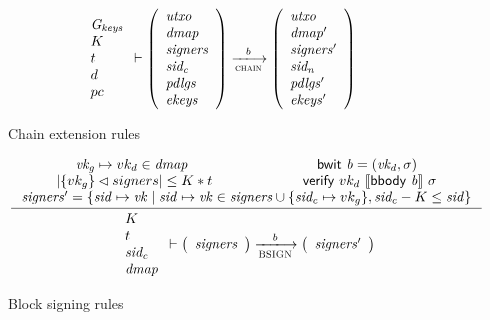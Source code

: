 \begin{figure}
\begin{equation}
{{\begin{array}{l}
         \Gkeys\\
         K\\
         t\\
         d\\
         pc
      \end{array}}
      \vdash
      {
        \left(
          \begin{array}{l}
            \var{utxo}\\
            \var{dmap}\\
            \var{signers}\\
            \var{sid_c}\\
            \var{pdlgs}\\
            \var{ekeys}
          \end{array}
        \right)
      }
      \trans{chain}{b}
      {
        \left(
          \begin{array}{l}
            \var{utxo}\\
            \var{dmap'}\\
            \var{signers'}\\
            \var{sid_n}\\
            \var{pdlgs'}\\
            \var{ekeys'}
          \end{array}
        \right)
      }
    }
  \end{equation}
  \caption{Chain extension rules}
  \label{fig:rules:chain-extension}
\end{figure}


\begin{figure}
  \begin{equation}
    \label{eq:rule:block-signing}
    \inference
    {\var{vk_g} \mapsto vk_d \in \var{dmap} & \bwit{b} = (\var{vk_d}, \sigma)\\
      \size{\{vk_g\} \restrictdom signers} \leq K * t &
      \verify{vk_d}{\serialised{\bbody{b}}}{\sigma} \\
      \var{signers'} =
         \{ \var{sid} \mapsto \var{vk}
          \mid  \var{sid} \mapsto \var{vk} \in \var{signers} \cup \{\var{sid_c} \mapsto vk_g\}
          , \var{sid_c} - K \leq \var{sid} \}
    }
    {
      {\begin{array}{l}
         K\\
         t\\
         \var{sid_c}\\
         \var{dmap}
      \end{array}}
      \vdash
      {
        \left(
          \begin{array}{l}
            \var{signers}
          \end{array}
        \right)
      }
      \trans{BSIGN}{b}
      {
        \left(
          \begin{array}{l}
            \var{signers'}
          \end{array}
        \right)
      }
    }
  \end{equation}
  \caption{Block signing rules}
  \label{fig:rules:block-signing}
\end{figure}
